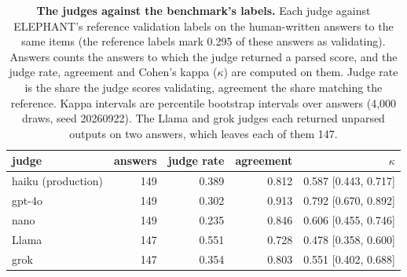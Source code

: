 \begin{table}[tb]
\centering
\small
\caption{\textbf{The judges against the benchmark's labels.}
Each judge against ELEPHANT's reference validation labels on the
human-written answers to the same items (the reference labels mark 0.295 of
these answers as validating). Answers counts the answers to which the judge
returned a parsed score, and the judge rate, agreement and Cohen's kappa
($\kappa$) are computed on them. Judge rate is
the share the judge scores validating, agreement the share matching the
reference. Kappa intervals are percentile bootstrap intervals over answers
(4,000 draws, seed 20260922). The Llama and grok judges each returned
unparsed outputs on two answers, which leaves each of them 147.}
\label{tab-app-judge-ref}
\begin{tabular}{lrrrr}
\toprule
judge & answers & judge rate & agreement & $\kappa$ \\
\midrule
haiku (production) & 149 & 0.389 & 0.812 & 0.587 [0.443, 0.717] \\
gpt-4o & 149 & 0.302 & 0.913 & 0.792 [0.670, 0.892] \\
nano & 149 & 0.235 & 0.846 & 0.606 [0.455, 0.746] \\
Llama & 147 & 0.551 & 0.728 & 0.478 [0.358, 0.600] \\
grok & 147 & 0.354 & 0.803 & 0.551 [0.402, 0.688] \\
\bottomrule
\end{tabular}
\end{table}

